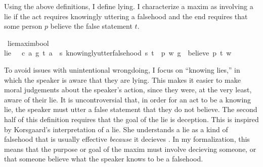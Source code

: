 \begin{isabellebody}
\begin{isamarkuptext}
Using the above definitions, I define lying. I characterize a maxim as involving a lie if 
the act requires knowingly uttering a falsehood and the end requires that some person $p$ believe 
the false statement $t$.%
\end{isamarkuptext}\isamarkuptrue%
\isamarkupfalse%
\ lie{\isacharcolon}{\isacharcolon}{\isachardoublequoteopen}maxim{\isasymRightarrow}bool{\isachardoublequoteclose}\ \ \isanewline
{\isachardoublequoteopen}lie\ {\isasymequiv}\ {\isasymlambda}\ {\isacharparenleft}c{\isacharcomma}\ a{\isacharcomma}\ g{\isacharparenright}{\isachardot}\ {\isasymexists}t{\isachardot}\ {\isacharparenleft}a\ \isactrlbold {\isasymlongrightarrow}\ {\isacharparenleft}{\isasymlambda}s{\isachardot}\ knowingly{\isacharunderscore}utter{\isacharunderscore}falsehood\ s\ t{\isacharparenright}{\isacharparenright}\ {\isasymand}\ {\isacharparenleft}{\isasymexists}p{\isachardot}\ {\isasymforall}w{\isachardot}\ {\isacharparenleft}g\ \isactrlbold {\isasymrightarrow}\ {\isacharparenleft}believe\ p\ t{\isacharparenright}{\isacharparenright}\ w{\isacharparenright}{\isachardoublequoteclose}\isanewline
%
%
\begin{isamarkuptext}%
To avoid issues with unintentional wrongdoing, I focus on ``knowing lies,'' 
in which the speaker is aware that they are lying. This makes it easier to make moral judgements about 
the speaker's action, since they were, at the very least, aware of their lie. It is uncontroversial 
that, in order for an act to be a knowing lie, the speaker must utter a false statement that they do 
not believe. The second half of
this definition requires that the goal of the lie is deception. This is inspired by  Korsgaard's interpretation 
of a lie. She understands a lie as a kind of falsehood that is usually effective \emph{because} it decieves
\citep[4]{KorsgaardRTL}. In my formalization, this means that the purpose or goal of the maxim must
involve decieving someone, or that someone believe what the speaker knows to be a 
falsehood. 


\end{isamarkuptext}
\end{isabellebody}
